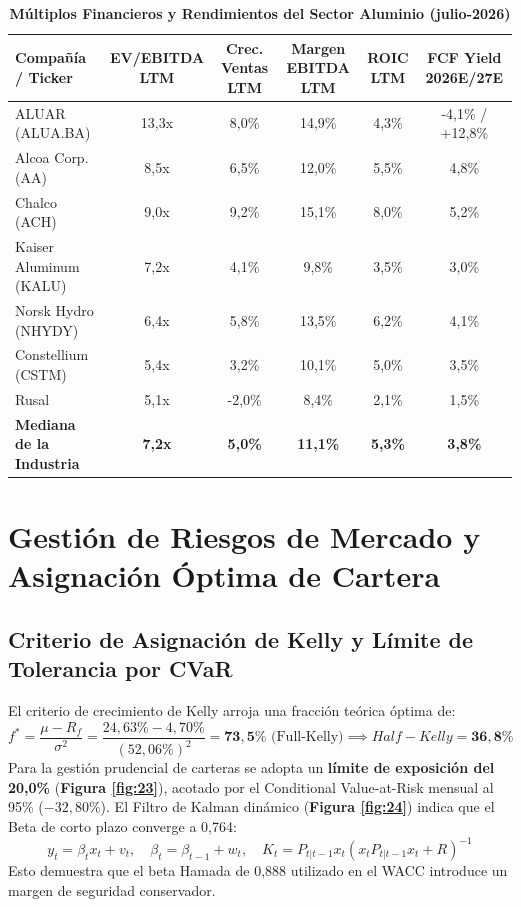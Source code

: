 \documentclass[10pt,a4paper]{article}
\begin{document}
\begin{table}[H]
\centering
\caption{\textbf{Múltiplos Financieros y Rendimientos del Sector Aluminio (julio-2026)}}
\scriptsize
\begin{tabularx}{\textwidth}{Xccccc}
\toprule
\textbf{Compañía / Ticker} & \textbf{EV/EBITDA LTM} & \textbf{Crec. Ventas LTM} & \textbf{Margen EBITDA LTM} & \textbf{ROIC LTM} & \textbf{FCF Yield 2026E/27E} \\
\midrule
ALUAR (ALUA.BA) & 13,3x & 8,0\% & 14,9\% & 4,3\% & -4,1\% / +12,8\% \\
Alcoa Corp. (AA) & 8,5x & 6,5\% & 12,0\% & 5,5\% & 4,8\% \\
Chalco (ACH) & 9,0x & 9,2\% & 15,1\% & 8,0\% & 5,2\% \\
Kaiser Aluminum (KALU) & 7,2x & 4,1\% & 9,8\% & 3,5\% & 3,0\% \\
Norsk Hydro (NHYDY) & 6,4x & 5,8\% & 13,5\% & 6,2\% & 4,1\% \\
Constellium (CSTM) & 5,4x & 3,2\% & 10,1\% & 5,0\% & 3,5\% \\
Rusal & 5,1x & -2,0\% & 8,4\% & 2,1\% & 1,5\% \\
\midrule
\textbf{Mediana de la Industria} & \textbf{7,2x} & \textbf{5,0\%} & \textbf{11,1\%} & \textbf{5,3\%} & \textbf{3,8\%} \\
\bottomrule
\end{tabularx}
\end{table}

\section{Gestión de Riesgos de Mercado y Asignación Óptima de Cartera}

\subsection{Criterio de Asignación de Kelly y Límite de Tolerancia por CVaR}
El criterio de crecimiento de Kelly arroja una fracción teórica óptima de:
\begin{equation}
    f^* = \frac{\mu - R_f}{\sigma^2} = \frac{24,63\% - 4,70\%}{(52,06\%)^2} = \mathbf{73,5\%} \text{ (Full-Kelly)} \implies Half-Kelly = \mathbf{36,8\%}
\end{equation}
Para la gestión prudencial de carteras se adopta un \textbf{límite de exposición del 20,0\%} (\textbf{Figura \ref{fig:23}}), acotado por el Conditional Value-at-Risk mensual al 95\% ($-32,80\%$). El Filtro de Kalman dinámico (\textbf{Figura \ref{fig:24}}) indica que el Beta de corto plazo converge a 0,764:
\begin{equation}
    y_t = \beta_t x_t + v_t, \quad \beta_t = \beta_{t-1} + w_t, \quad K_t = P_{t|t-1} x_t (x_t P_{t|t-1} x_t + R)^{-1}
\end{equation}
Esto demuestra que el beta Hamada de 0,888 utilizado en el WACC introduce un margen de seguridad conservador.
\end{document}
